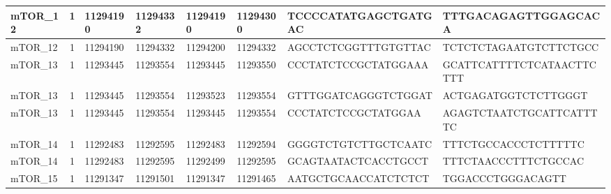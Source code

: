 \begin{landscape}
\begin{longtable}{| p{} | p{} | p{} | p{} | p{} | p{} | p{} | p{} |}
\multicolumn{1}{|l|}{mTOR\_12}   & \multicolumn{1}{c|}{1}  & \multicolumn{1}{l|}{11294190}  & \multicolumn{1}{l|}{11294332}  & \multicolumn{1}{l|}{11294190}  & \multicolumn{1}{l|}{11294300}  & \multicolumn{1}{l|}{TCCCCATATGAGCTGATGAC}            & \multicolumn{1}{l|}{TTTGACAGAGTTGGAGCACA}          \\ \hline
\multicolumn{1}{|l|}{mTOR\_12}   & \multicolumn{1}{c|}{1}  & \multicolumn{1}{l|}{11294190}  & \multicolumn{1}{l|}{11294332}  & \multicolumn{1}{l|}{11294200}  & \multicolumn{1}{l|}{11294332}  & \multicolumn{1}{l|}{AGCCTCTCGGTTTGTGTTAC}            & \multicolumn{1}{l|}{TCTCTCTAGAATGTCTTCTGCC}        \\ \hline
\multicolumn{1}{|l|}{mTOR\_13}   & \multicolumn{1}{c|}{1}  & \multicolumn{1}{l|}{11293445}  & \multicolumn{1}{l|}{11293554}  & \multicolumn{1}{l|}{11293445}  & \multicolumn{1}{l|}{11293550}  & \multicolumn{1}{l|}{CCCTATCTCCGCTATGGAAA}            & \multicolumn{1}{l|}{GCATTCATTTTCTCATAACTTCTTT}     \\ \hline
\multicolumn{1}{|l|}{mTOR\_13}   & \multicolumn{1}{c|}{1}  & \multicolumn{1}{l|}{11293445}  & \multicolumn{1}{l|}{11293554}  & \multicolumn{1}{l|}{11293523}  & \multicolumn{1}{l|}{11293554}  & \multicolumn{1}{l|}{GTTTGGATCAGGGTCTGGAT}            & \multicolumn{1}{l|}{ACTGAGATGGTCTCTTGGGT}          \\ \hline
\multicolumn{1}{|l|}{mTOR\_13}   & \multicolumn{1}{c|}{1}  & \multicolumn{1}{l|}{11293445}  & \multicolumn{1}{l|}{11293554}  & \multicolumn{1}{l|}{11293445}  & \multicolumn{1}{l|}{11293554}  & \multicolumn{1}{l|}{CCCTATCTCCGCTATGGAA}             & \multicolumn{1}{l|}{AGAGTCTAATCTGCATTCATTTTC}      \\ \hline
\multicolumn{1}{|l|}{mTOR\_14}   & \multicolumn{1}{c|}{1}  & \multicolumn{1}{l|}{11292483}  & \multicolumn{1}{l|}{11292595}  & \multicolumn{1}{l|}{11292483}  & \multicolumn{1}{l|}{11292594}  & \multicolumn{1}{l|}{GGGGTCTGTCTTGCTCAATC}            & \multicolumn{1}{l|}{TTTCTGCCACCCTCTTTTTC}          \\ \hline
\multicolumn{1}{|l|}{mTOR\_14}   & \multicolumn{1}{c|}{1}  & \multicolumn{1}{l|}{11292483}  & \multicolumn{1}{l|}{11292595}  & \multicolumn{1}{l|}{11292499}  & \multicolumn{1}{l|}{11292595}  & \multicolumn{1}{l|}{GCAGTAATACTCACCTGCCT}            & \multicolumn{1}{l|}{TTTCTAACCCTTTCTGCCAC}          \\ \hline
\multicolumn{1}{|l|}{mTOR\_15}   & \multicolumn{1}{c|}{1}  & \multicolumn{1}{l|}{11291347}  & \multicolumn{1}{l|}{11291501}  & \multicolumn{1}{l|}{11291347}  & \multicolumn{1}{l|}{11291465}  & \multicolumn{1}{l|}{AATGCTGCAACCATCTCTCT}            & \multicolumn{1}{l|}{TGGACCCTGGGACAGTT}             \\ \hline

\end{longtable}
\end{landscape}
